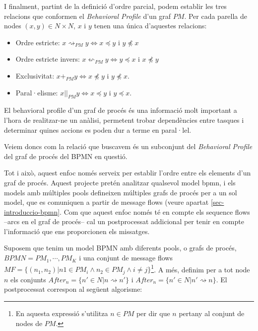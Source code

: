 I finalment, partint de la definició d'ordre parcial, podem establir les tres relacions que conformen el \emph{Behavioral Profile} d'un graf $PM$. Per cada parella de nodes $(x,y) \in N\times N$, $x$ i $y$ tenen una única d'aquestes relacions:
\begin{itemize}
    \item Ordre estricte: $x \rightsquigarrow _{PM} y \iff x \preceq y$ i $y \npreceq x$ 
    \item Ordre estricte invers: $x \leftsquigarrow _{PM} y \iff y \preceq x$ i $x \npreceq y$ 
    \item Exclusivitat: $x +_{PM} y \iff x \npreceq y$ i $y \npreceq x$.
    \item Paral·elisme: $x ||_{PM} y \iff x \preceq y$ i $y \preceq x$.
\end{itemize}

El behavioral profile d'un graf de procés és una informació molt important a l'hora de realitzar-ne un anàlisi, permetent trobar dependències entre tasques i determinar quines accions es poden dur a terme en paral·lel.

Veiem doncs com la relació que buscavem és un subconjunt del \emph{Behavioral Profile} del graf de procés del BPMN en questió. 

Tot i això, aquest enfoc només serveix per establir l'ordre entre els elements d'un graf de procés. Aquest projecte pretén analitzar qualsevol model bpmn, i els models amb múltiples pools defineixen múltiples grafs de procés per a un sol model, que es comuniquen a partir de message flows (veure apartat \ref{sec-introduccio-bpmn}. Com que aquest enfoc només té en compte els sequence flows --arcs en el graf de procés-- cal un postprocessat addicional per tenir en compte l'informació que ens proporcionen els missatges. 

Suposem que tenim un model BPMN amb diferents pools, o grafs de procés, $BPMN = {PM_1, \cdots, PM_K}$ i una conjunt de message flows $MF = \{(n_1, n_2) | n1 \in PM_i \land n_2 \in PM_j \land i \neq j\}$\footnote{En aquesta expressió s'utilitza $n \in PM$ per dir que $n$ pertany al conjunt de nodes de $PM$.}. A més, definim per a tot node $n$ els conjunts $After_n = \{n' \in N | n \rightsquigarrow n'\}$ i $After_n = \{n' \in N | n' \rightsquigarrow n\}$. El postprocessat correspon al següent algorisme:

